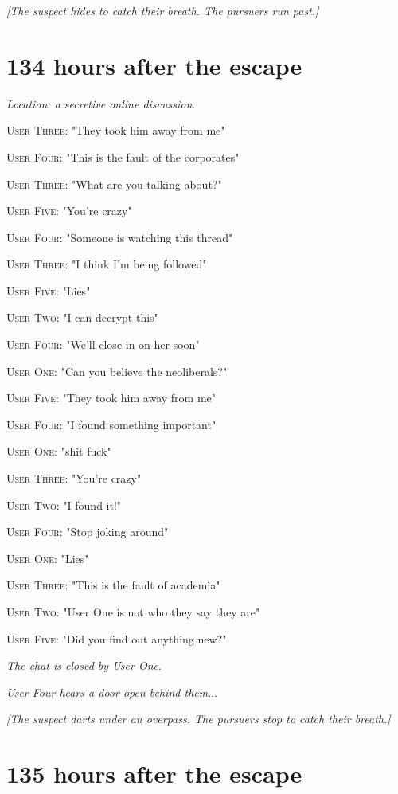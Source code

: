 \documentclass{report}
\begin{document}
\textit{[The suspect hides to catch their breath. The pursuers run past.]}


\section*{134 \small{hours after the escape}}

\textit{Location: a secretive online discussion}. 

\textsc{User Three}: "They took him away from me" 

\textsc{User Four}: "This is the fault of the corporates" 

\textsc{User Three}: "What are you talking about?" 

\textsc{User Five}: "You're crazy" 

\textsc{User Four}: "Someone is watching this thread" 

\textsc{User Three}: "I think I'm being followed" 

\textsc{User Five}: "Lies" 

\textsc{User Two}: "I can decrypt this" 

\textsc{User Four}: "We'll close in on her soon" 

\textsc{User One}: "Can you believe the neoliberals?" 

\textsc{User Five}: "They took him away from me" 

\textsc{User Four}: "I found something important" 

\textsc{User One}: "shit fuck" 

\textsc{User Three}: "You're crazy" 

\textsc{User Two}: "I found it!" 

\textsc{User Four}: "Stop joking around" 

\textsc{User One}: "Lies" 

\textsc{User Three}: "This is the fault of academia" 

\textsc{User Two}: "User One is not who they say they are" 

\textsc{User Five}: "Did you find out anything new?" 

\textit{The chat is closed by User One}. 

\textit{User Four hears a door open behind them}...

\textit{[The suspect darts under an overpass. The pursuers stop to catch their breath.]}


\section*{135 \small{hours after the escape}}
\end{document}
